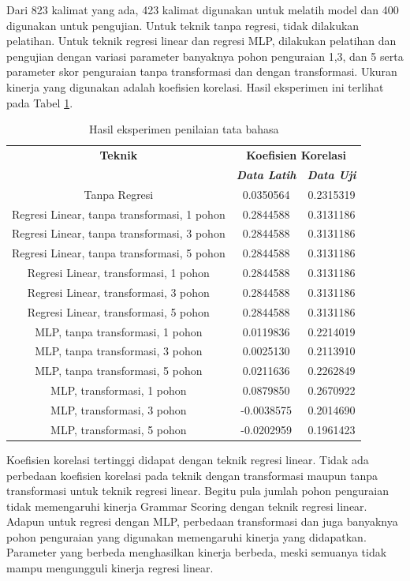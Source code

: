 \documentclass[conference]{IEEEtran}
\begin{document}
Dari 823 kalimat yang ada, 423 kalimat digunakan untuk melatih model dan 400 digunakan untuk pengujian. Untuk teknik tanpa regresi, tidak dilakukan pelatihan. Untuk teknik regresi linear dan regresi MLP, dilakukan pelatihan dan pengujian dengan variasi parameter banyaknya pohon penguraian 1,3, dan 5 serta parameter skor penguraian tanpa transformasi dan dengan transformasi. Ukuran kinerja yang digunakan adalah koefisien korelasi. Hasil eksperimen ini terlihat pada Tabel \ref{tabeksperimenscoring}.

\begin{table}[h]
\caption{Hasil eksperimen penilaian tata bahasa}
\begin{center}
\begin{tabular}{|c|c|c|}
\hline
\textbf{Teknik}&\multicolumn{2}{|c|}{\textbf{Koefisien Korelasi}} \\
\cline{2-3} 
 & \textbf{\textit{Data Latih}}& \textbf{\textit{Data Uji}} \\
\hline
Tanpa Regresi& 0.0350564& 0.2315319 \\
Regresi Linear, tanpa transformasi, 1 pohon& 0.2844588&
0.3131186  \\
Regresi Linear, tanpa transformasi, 3 pohon&0.2844588 & 0.3131186 \\
Regresi Linear, tanpa transformasi, 5 pohon&0.2844588 & 0.3131186 \\
Regresi Linear, transformasi, 1 pohon&0.2844588 & 0.3131186 \\
Regresi Linear, transformasi, 3 pohon&0.2844588 &0.3131186  \\
Regresi Linear, transformasi, 5 pohon&0.2844588 & 0.3131186 \\
MLP, tanpa transformasi, 1 pohon&0.0119836 & 0.2214019 \\
MLP, tanpa transformasi, 3 pohon&0.0025130 &0.2113910  \\
MLP, tanpa transformasi, 5 pohon&0.0211636 & 0.2262849 \\
MLP, transformasi, 1 pohon&0.0879850 &0.2670922  \\
MLP, transformasi, 3 pohon&-0.0038575 &0.2014690  \\
MLP, transformasi, 5 pohon&-0.0202959 &0.1961423  \\
\hline
\end{tabular}
\label{tabeksperimenscoring}
\end{center}
\end{table}

Koefisien korelasi tertinggi didapat dengan teknik regresi linear. Tidak ada perbedaan koefisien korelasi pada teknik dengan transformasi maupun tanpa transformasi untuk teknik regresi linear. Begitu pula jumlah pohon penguraian tidak memengaruhi kinerja Grammar Scoring dengan teknik regresi linear. Adapun untuk regresi dengan MLP, perbedaan transformasi dan juga banyaknya pohon penguraian yang digunakan memengaruhi kinerja yang didapatkan. Parameter yang berbeda menghasilkan kinerja berbeda, meski semuanya tidak mampu mengungguli kinerja regresi linear.
\end{document}

